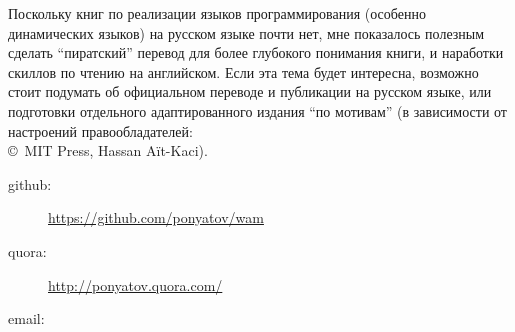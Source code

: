 Поскольку книг по реализации языков программирования (особенно динамических
языков) на русском языке почти нет\cite{dragon,plai}, мне показалось полезным
сделать ``пиратский'' перевод для более глубокого понимания книги, и наработки
скиллов по чтению на английском. Если эта тема будет интересна, возможно стоит
подумать об официальном переводе и публикации на русском языке, или подготовки
отдельного адаптированного издания ``по мотивам'' (в зависимости от настроений
правообладателей:\\\copyright\ MIT Press, Hassan A\"it-Kaci).

\bigskip
\begin{description}
\item[github:] \url{https://github.com/ponyatov/wam}
\item[quora:] \url{http://ponyatov.quora.com/}
\item[email:] 
\end{description}
 